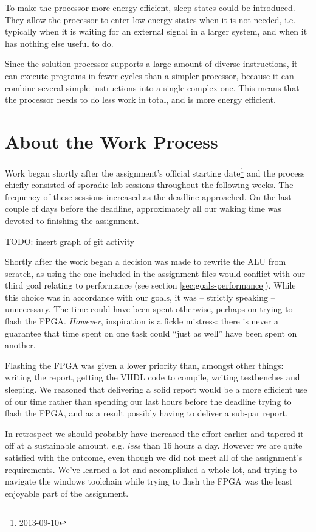To make the processor more energy efficient, sleep states could be introduced.
They allow the processor to enter low energy states when it is not needed, i.e. typically when it is waiting for an external signal in a larger system, and when it has nothing else useful to do.

Since the solution processor supports a large amount of diverse instructions, it can execute programs in fewer cycles than a simpler processor, because it can combine several simple instructions into a single complex one.
This means that the processor needs to do less work in total, and is more energy efficient.

\section{About the Work Process}

Work began shortly after the assignment's official starting date\footnote{2013-09-10} and the process chiefly consisted of sporadic lab sessions throughout the following weeks.
The frequency of these sessions increased as the deadline approached.
On the last couple of days before the deadline, approximately all our waking time was devoted to finishing the assignment.

TODO: insert graph of git activity

Shortly after the work began a decision was made to rewrite the ALU from scratch, as using the one included in the assignment files would conflict with our third goal relating to performance (see section \vref{sec:goals-performance}).
While this choice was in accordance with our goals, it was -- strictly speaking -- unnecessary.
The time could have been spent otherwise, perhaps on trying to flash the FPGA.
\textit{However}, inspiration is a fickle mistress: there is never a guarantee that time spent on one task could ``just as well'' have been spent on another.

Flashing the FPGA was given a lower priority than, amongst other things: writing the report, getting the VHDL code to compile, writing testbenches and sleeping.
We reasoned that delivering a solid report would be a more efficient use of our time rather than spending our last hours before the deadline trying to flash the FPGA, and as a result possibly having to deliver a sub-par report.

In retrospect we should probably have increased the effort earlier and tapered it off at a sustainable amount, e.g. \textit{less} than 16 hours a day.
However we are quite satisfied with the outcome, even though we did not meet all of the assignment's requirements.
We've learned a lot and accomplished a whole lot, and trying to navigate the windows toolchain while trying to flash the FPGA was the least enjoyable part of the assignment.

